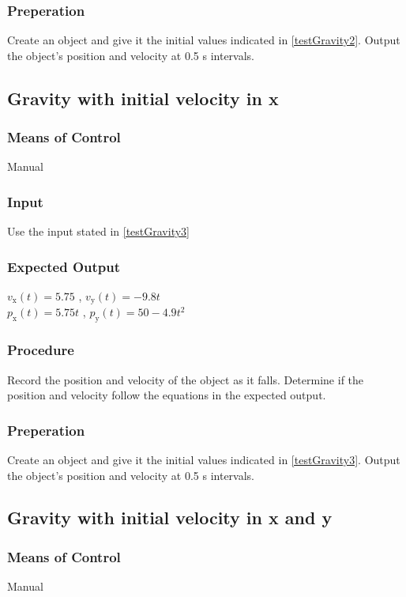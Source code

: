 \documentclass[12pt]{article}
\begin{document}
\subsubsection{Preperation}
Create an object and give it the initial values indicated in \ref{testGravity2}.
Output the object's position and velocity at 0.5 s intervals.


\subsection{Gravity with initial velocity in x}
\subsubsection{Means of Control}
Manual
\subsubsection{Input}
Use the input stated in \ref{testGravity3}

\subsubsection{Expected Output}
$v_\text{x}(t) = 5.75$ , $v_\text{y}(t) = -9.8t$ \\
$p_\text{x}(t) = 5.75t$ , $p_\text{y}(t) = 50 - 4.9t^{2}$
 
\subsubsection{Procedure}
Record the position and velocity of the object as it falls. Determine if the 
position and velocity follow the equations in the expected output.  

\subsubsection{Preperation}
Create an object and give it the initial values indicated in \ref{testGravity3}.
Output the object's position and velocity at 0.5 s intervals.


\subsection{Gravity with initial velocity in x and y}
\subsubsection{Means of Control}
Manual
\end{document}
